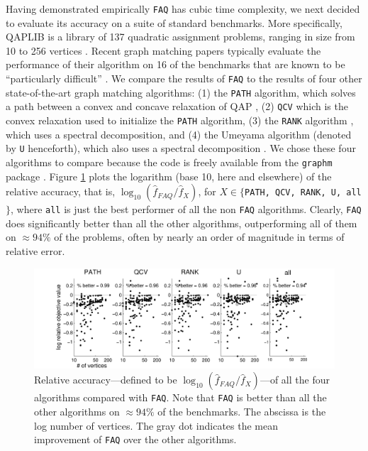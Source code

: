 \documentclass[11pt]{article}
\providecommand{\mh}[1]{\hat{#1}}
\newcommand{\FAQ}{\texttt{FAQ} }
\begin{document}
Having demonstrated empirically \texttt{FAQ} has cubic time complexity, we next decided to evaluate its accuracy on a suite of standard benchmarks.  More specifically, QAPLIB is a library of 137 quadratic assignment problems, ranging in size from 10 to 256 vertices \cite{Burkard1997}.  Recent graph matching papers typically evaluate the performance of their algorithm on 16 of the benchmarks that are known to be ``particularly difficult'' \cite{Zaslavskiy2009,Schellewald2001}.  We compare the results of \FAQ to the results of four other state-of-the-art graph matching algorithms: (1) the \texttt{PATH} algorithm, which solves a path between a convex and concave relaxation of QAP \cite{Zaslavskiy2009}, (2) \texttt{QCV} which is the convex relaxation used to initialize the \texttt{PATH} algorithm, (3) the \texttt{RANK} algorithm \cite{Singh2007}, which uses a spectral decomposition, and (4)  the Umeyama algorithm (denoted by \texttt{U} henceforth), which also uses a spectral decomposition \cite{Umeyama1988}.  We chose these four algorithms to compare because the code is freely available from the \texttt{graphm} package \cite{Zaslavskiy2009}.  
Figure \ref{fig:allRelAccuracy} plots the logarithm (base 10, here and elsewhere) of the relative accuracy, that is, $\log_{10}(\mh{f}_{FAQ}/\mh{f}_X)$, for $X \in \{$\texttt{PATH, QCV, RANK, U, all}$\}$, where \texttt{all} is just the best performer of all the non \FAQ algorithms.  Clearly, \FAQ does significantly better than all the other algorithms, outperforming all of them on $\approx 94\%$ of the problems, often by nearly an order of magnitude in terms of relative error.

\begin{figure}[htbp]
	\centering
		\includegraphics[width=1.0\linewidth]{allRelAccuracy.pdf}
	\caption{Relative accuracy---defined to be $\log_{10}(\mh{f}_{FAQ}/\mh{f}_X)$---of all the four algorithms compared with \texttt{FAQ}.  Note that \FAQ is better than all the other algorithms on $\approx 94\%$ of the benchmarks. The abscissa is the log number of vertices.  The gray dot indicates the mean improvement of \FAQ over the other algorithms.}
	\label{fig:allRelAccuracy}
\end{figure}
\end{document}
